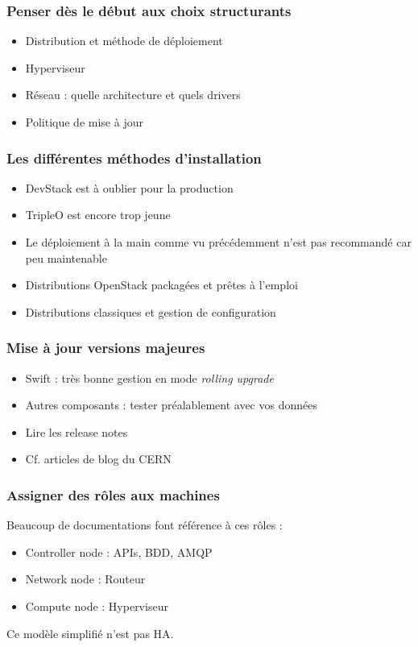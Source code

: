   \begin{frame}
    \frametitle{Penser dès le début aux choix structurants}
    \begin{itemize}
      \item Distribution et méthode de déploiement
      \item Hyperviseur
      \item Réseau : quelle architecture et quels drivers
      \item Politique de mise à jour
    \end{itemize}
  \end{frame}

  \begin{frame}
    \frametitle{Les différentes méthodes d'installation}
    \begin{itemize}
      \item DevStack est à oublier pour la production
      \item TripleO est encore trop jeune
      \item Le déploiement à la main comme vu précédemment n'est pas recommandé car peu maintenable
      \item Distributions OpenStack packagées et prêtes à l'emploi
      \item Distributions classiques et gestion de configuration
    \end{itemize}
  \end{frame}

  \begin{frame}
    \frametitle{Mise à jour versions majeures}
    \begin{itemize}
      \item Swift : très bonne gestion en mode \textit{rolling upgrade}
      \item Autres composants : tester préalablement avec vos données
      \item Lire les release notes
      \item Cf. articles de blog du CERN
    \end{itemize}
  \end{frame}

  \begin{frame}
    \frametitle{Assigner des rôles aux machines}
    Beaucoup de documentations font référence à ces rôles :
    \begin{itemize}
      \item Controller node : APIs, BDD, AMQP
      \item Network node : Routeur
      \item Compute node : Hyperviseur
    \end{itemize}
    Ce modèle simplifié n'est pas HA.
  \end{frame}

